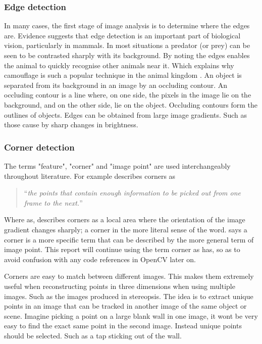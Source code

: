 \documentclass[11pt,oneside]{report}
\begin{document}
					\subsubsection{Edge detection}
					In many cases, the first stage of image analysis is to determine where the edges are.
					Evidence suggests that edge detection is an important part of biological vision, particularly in mammals.
					In most situations a predator (or prey) can be seen to be contrasted sharply with its background.
					By noting the edges enables the animal to quickly recognise other animals near it.
					Which explains why camouflage is such a popular technique in the animal kingdom \cite{book:aiIlluminated}.
					An object is separated from its background in an image by an occluding contour.
					An occluding contour is a line where, on one side, the pixels in the image lie on the background, and on the other side, lie on the object.
					Occluding contours form the outlines of objects.
					Edges can be obtained from large image gradients.
					Such as those cause by sharp changes in brightness.
					\subsubsection{Corner detection}
					The terms "feature", "corner" and "image point" are used interchangeably throughout literature.
					For example  describes corners as
					\begin{quote}
						``\textit{the points that contain enough information to be picked out from one frame to the next.}''
					\end{quote}
					Where as,  describes corners as a local area where the orientation of the image gradient changes sharply; a corner in the more literal sense of the word.
					 says a corner is a more specific term that can be described by the more general term of image point.
					This report will continue using the term corner as  has, so as to avoid confusion with any code references in OpenCV later on.
					
					Corners are easy to match between different images.
					This makes them extremely useful when reconstructing points in three dimensions when using multiple images.
					Such as the images produced in stereopsis.
					The idea is to extract unique points in an image that can be tracked in another image of the same object or scene.
					Imagine picking a point on a large blank wall in one image, it wont be very easy to find the exact same point in the second image.
					Instead unique points should be selected.
					Such as a tap sticking out of the wall.
					
\end{document}
